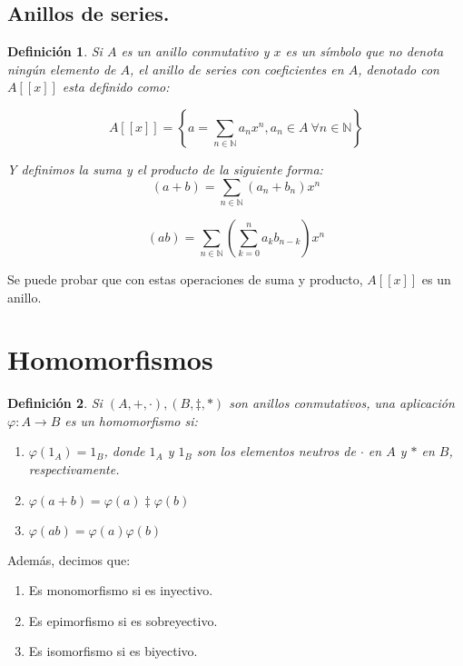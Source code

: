 \documentclass[11pt, a4paper, titlepage]{article}
\theoremstyle{theorem-style}
\theoremstyle{definition-style}
\newtheorem*{ndef}{Definición}
\theoremstyle{remark-style}
\theoremstyle{example-style}
\begin{document}
\subsection*{Anillos de series.}
\begin{ndef}
  Si $A$ es un anillo conmutativo y $x$ es un símbolo que no denota ningún elemento de $A$, el anillo de series con coeficientes en $A$, denotado con $A[[x]]$ esta definido como:

\[
    A[[x]] = \left\{a = \displaystyle\sum_{n\in \mathbb{N}} a_n x^n , a_n \in A\ \forall	n \in \mathbb{N}\right\}
\]

Y definimos la suma y el producto de la siguiente forma:\\
\[(a+b) = \sum_{n\in \mathbb{N}}(a_n+b_n)x^n\]

\[ (ab) = \sum_{n\in \mathbb{N}} \left(\sum_{k=0}^n a_k b_{n-k}\right)x^n\]

\end{ndef}

Se puede probar que con estas operaciones de suma y producto, $A[[x]]$ es un anillo.

\section{Homomorfismos}

\begin{ndef}
Si $(A, +, \cdot), (B, \ddagger, \ast)$ son anillos conmutativos, una aplicación $\varphi: A \to B$ es un homomorfismo si:

\begin{enumerate}
	\item $\varphi(1_A) = 1_B$, donde $1_A$ y $1_B$ son los elementos neutros de $\cdot$ en $A$ y $\ast$ en $B$, respectivamente.
	\item $\varphi(a+b) = \varphi(a) \ddagger \varphi(b)$
	\item $\varphi(ab) = \varphi(a)  \varphi(b)$
	
\end{enumerate}
	
\end{ndef}

Además, decimos que:

\begin{enumerate}
	\item Es monomorfismo si es inyectivo.
	\item Es epimorfismo si es sobreyectivo.
	\item Es isomorfismo si es biyectivo.
\end{enumerate}
\end{document}
